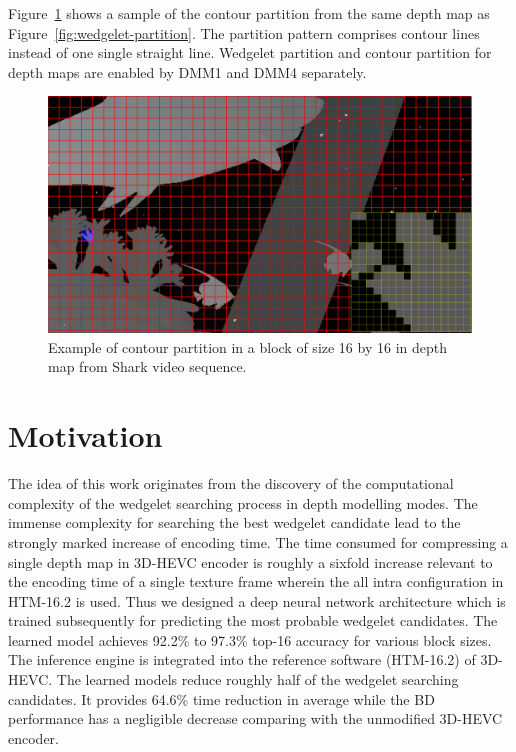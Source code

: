 Figure~\ref{fig:contour-partition} shows a sample of the contour partition
from the same depth map as Figure~\ref{fig:wedgelet-partition}.
The partition pattern comprises contour lines instead of one single
straight line.
Wedgelet partition and contour partition for depth maps
are enabled by DMM1 and DMM4 separately.
\begin{figure}
    \centering
    \includegraphics[width=\textwidth,height=\textheight,keepaspectratio]{Figures/contour}
    \caption[Contour partition illustration]
    {Example of contour partition in a block of size 16 by 16 in depth map
    from Shark video sequence.
    }
    \label{fig:contour-partition}
\end{figure}


\section{Motivation}\label{sec:motivation_and_contribution}
The idea of this work originates from the discovery of the computational
complexity of the wedgelet searching process in depth modelling modes.
The immense complexity for searching the best wedgelet candidate lead to
the strongly marked increase of encoding time.
The time consumed for compressing a single depth map in 3D-HEVC encoder is
roughly a sixfold increase relevant to the encoding time of a single texture
frame wherein the all intra configuration in HTM-16.2 is used.
Thus we designed a deep neural network architecture which is trained
subsequently for predicting the most probable wedgelet candidates.
The learned model achieves 92.2\% to 97.3\% top-16 accuracy for various
block sizes.
The inference engine is integrated into the reference software
(HTM-16.2) of 3D-HEVC.
The learned models reduce roughly half of the wedgelet searching candidates.
It provides 64.6\% time reduction in average while the BD performance
has a negligible decrease comparing with the unmodified 3D-HEVC encoder.

